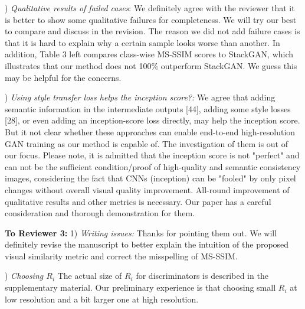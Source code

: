 \documentclass[10pt,twocolumn,letterpaper]{article}
\begin{document}

) \textit{Qualitative results of failed cases}: We definitely agree with the reviewer that it is better to show some qualitative failures for completeness. We will try our best to compare and discuss in the revision. 
The reason we did not add failure cases is that it is hard to explain why a certain sample looks worse than another. In addition, Table 3 left compares class-wise MS-SSIM scores to StackGAN, which illustrates that our method does not 100\% outperform StackGAN. We guess this may be helpful for the concerns. 

) \textit{Using style transfer loss helps the inception score?:} %
We agree that adding semantic information in the intermediate outputs [44], adding some style losses [28], or even adding an inception-score loss directly, may help the inception score. But it not clear whether these approaches can enable end-to-end high-resolution GAN training as our method is capable of. The investigation of them is out of our focus. Please note, it is admitted that the inception score is not "perfect" and can not be the sufficient condition/proof of high-quality and semantic consistency images, considering the fact that CNNs (inception) can be "fooled" by only pixel changes without overall visual quality improvement. All-round improvement of qualitative results and other metrics is necessary. Our paper has a careful consideration and thorough demonstration for them.

\noindent
\textbf{To Reviewer 3:} 1) \textit{Writing issues:} Thanks for pointing them out. We will definitely revise the manuscript to better explain the intuition of the proposed visual similarity metric and correct the misspelling of MS-SSIM.


) \textit{Choosing $R_i$} The actual size of $R_i$ for discriminators is described in the supplementary material. Our preliminary experience is that choosing small $R_i$ at low resolution and a bit larger one at high resolution.
\end{document}
